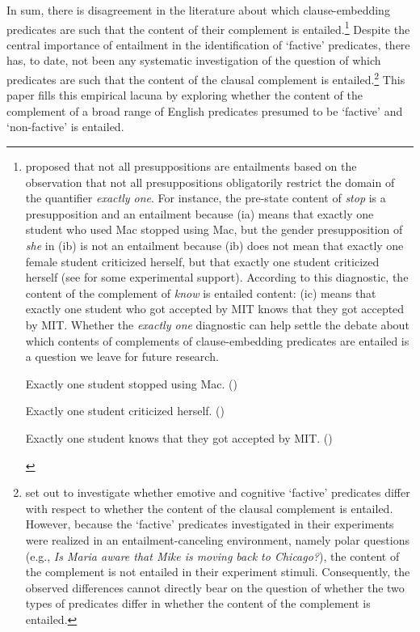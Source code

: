 \documentclass[11pt,fleqn]{article}
\newcommand{\6}{\mbox{$[\hspace*{-.6mm}[$}}
\newcommand{\9}{\mbox{$]\hspace*{-.6mm}]$}}
\begin{document}
In sum, there is disagreement in the literature about which clause-embedding predicates are such that the content of their complement is entailed.\footnote{\citealt{sudo-thesis} proposed that not all presuppositions are entailments based on the observation that not all presuppositions obligatorily restrict the domain of the quantifier {\em exactly one}. For instance, the pre-state content of {\em stop} is a presupposition and an entailment because (ia) means that exactly one student who used Mac stopped using Mac, but the gender presupposition of {\em she} in (ib) is not an entailment because (ib) does not mean that exactly one female student criticized herself, but that exactly one student criticized herself (see \citealt{zehr-schwarz2016,zehr-schwarz2018} for some experimental support). According to this diagnostic, the content of the complement of {\em know} is entailed content: (ic) means that exactly one student who got accepted by MIT knows that they got accepted by MIT. Whether the {\em exactly one} diagnostic can help settle the debate about which contents of complements of clause-embedding predicates are entailed is a question we leave for future research.

\begin{exe}
\begin{xlist}
\ex Exactly one student stopped using Mac. \hfill (\citealt[59]{sudo-thesis})

\ex Exactly one student criticized herself. \hfill (\citealt[61]{sudo-thesis})

\ex Exactly one student knows that they got accepted by MIT. \hfill (\citealt[64]{sudo-thesis})

\end{xlist}
\end{exe}} Despite the central importance of entailment in the identification of `factive' predicates, there has, to date, not been any systematic investigation of the question of which predicates are such that the content of the clausal complement is entailed.\footnote{\citet{djaerv-etal2016} set out to investigate whether emotive and cognitive `factive' predicates differ with respect to whether the content of the clausal complement is entailed. However, because the `factive' predicates investigated in their experiments were realized in an entailment-canceling environment, namely polar questions (e.g., {\em Is Maria aware that Mike is moving back to Chicago?}), the content of the complement is not entailed in their experiment stimuli. Consequently, the observed differences cannot directly bear on the question of whether the two types of predicates differ in whether the content of the complement is entailed.} This paper fills this empirical lacuna by exploring whether the content of the complement of a broad range of English predicates presumed to be `factive' and `non-factive' is entailed.
\end{document}
